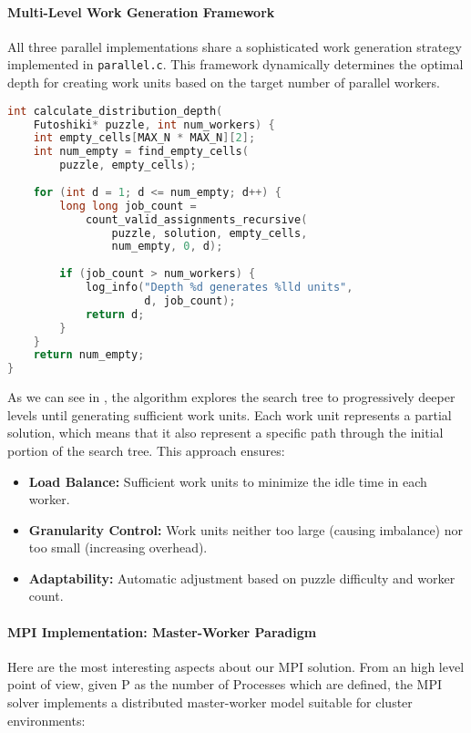 \paragraph{Multi-Level Work Generation Framework}
\label{par:dynamic_load_balancing}
All three parallel implementations share a sophisticated work generation strategy implemented in \texttt{parallel.c}. This framework dynamically determines the optimal depth for creating work units based on the target number of parallel workers.

\begin{lstlisting}[language=C, caption=Dynamic depth calculation,label={listing:calculate_distribution_depth}]
int calculate_distribution_depth(
    Futoshiki* puzzle, int num_workers) {
    int empty_cells[MAX_N * MAX_N][2];
    int num_empty = find_empty_cells(
        puzzle, empty_cells);
    
    for (int d = 1; d <= num_empty; d++) {
        long long job_count = 
            count_valid_assignments_recursive(
                puzzle, solution, empty_cells, 
                num_empty, 0, d);
        
        if (job_count > num_workers) {
            log_info("Depth %d generates %lld units", 
                     d, job_count);
            return d;
        }
    }
    return num_empty;
}
\end{lstlisting}

As we can see in , the algorithm explores the search tree to progressively deeper levels until generating sufficient work units. Each work unit represents a partial solution, which means that it also represent a specific path through the initial portion of the search tree. This approach ensures:
\begin{itemize}
    \item \textbf{Load Balance:} Sufficient work units to minimize the idle time in each worker.
    \item \textbf{Granularity Control:} Work units neither too large (causing imbalance) nor too small (increasing overhead).
    \item \textbf{Adaptability:} Automatic adjustment based on puzzle difficulty and worker count.
\end{itemize}

\paragraph{MPI Implementation: Master-Worker Paradigm}
\label{par:mpi_implementation}
Here are the most interesting aspects about our MPI solution. From an high level point of view, given P as the number of Processes which are defined, the MPI solver implements a distributed master-worker model suitable for cluster environments:

